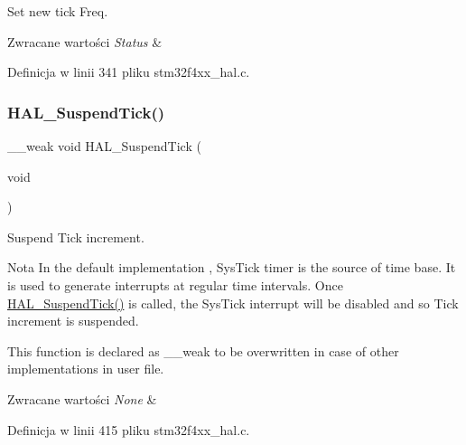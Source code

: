Set new tick Freq. 


\begin{DoxyRetVals}{Zwracane wartości}
{\em Status} & \\
\hline
\end{DoxyRetVals}


Definicja w linii 341 pliku stm32f4xx\+\_\+hal.\+c.

\mbox{\label{group___h_a_l___exported___functions___group2_ga84ae4b045c45d49d96b2b02e2dc516b6}} 
\subsubsection{\texorpdfstring{H\+A\+L\+\_\+\+Suspend\+Tick()}{HAL\_SuspendTick()}}
{\footnotesize\ttfamily \+\_\+\+\_\+weak void H\+A\+L\+\_\+\+Suspend\+Tick (\begin{DoxyParamCaption}\item[{void}]{ }\end{DoxyParamCaption})}



Suspend Tick increment. 

\begin{DoxyNote}{Nota}
In the default implementation , Sys\+Tick timer is the source of time base. It is used to generate interrupts at regular time intervals. Once \hyperlink{group___h_a_l___exported___functions___group2_ga84ae4b045c45d49d96b2b02e2dc516b6}{H\+A\+L\+\_\+\+Suspend\+Tick()} is called, the Sys\+Tick interrupt will be disabled and so Tick increment is suspended. 

This function is declared as \+\_\+\+\_\+weak to be overwritten in case of other implementations in user file. 
\end{DoxyNote}

\begin{DoxyRetVals}{Zwracane wartości}
{\em None} & \\
\hline
\end{DoxyRetVals}


Definicja w linii 415 pliku stm32f4xx\+\_\+hal.\+c.

